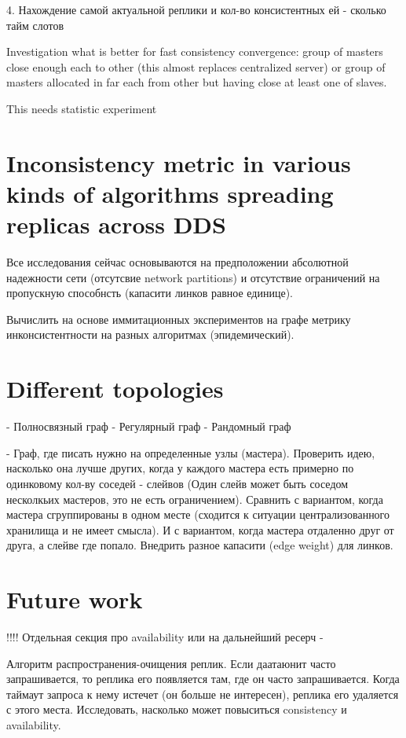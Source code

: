 \documentclass{llncs}
\begin{document}
4. Нахождение самой актуальной реплики и кол-во консистентных ей - сколько тайм слотов

Investigation what is better for fast consistency convergence:
group of masters close enough each to other (this almost replaces centralized server)
or group of masters allocated in far each from other but having close at least one of slaves.

This needs statistic experiment

\section{Inconsistency metric in various kinds of algorithms spreading replicas across DDS}
Все исследования сейчас основываются на предположении абсолютной надежности сети (отсутсвие network partitions) и отсутствие ограничений на пропускную способнсть (капасити линков равное единице).

Вычислить на основе иммитационных экспериментов на графе метрику инконсистентности на разных алгоритмах (эпидемический).

\section{Different topologies}
- Полносвязный граф
- Регулярный граф
- Рандомный граф

- Граф, где писать нужно на определенные узлы (мастера). Проверить идею, насколько она лучше других, когда у каждого мастера есть примерно по одинковому кол-ву соседей - слейвов (Один слейв может быть соседом несколкьих мастеров, это не есть ограничением). Сравнить с вариантом, когда мастера сгруппированы в одном месте (сходится к ситуации централизованного хранилища и не имеет смысла). И с вариантом, когда мастера отдаленно друг от друга, а слейве где попало.
Внедрить разное капасити (edge weight) для линков.

\section{Future work}
!!!! Отдельная секция про availability или на дальнейший ресерч -

Алгоритм распространения-очищения реплик. Если даатаюнит часто запрашивается, то реплика его появляется там, где он часто запрашивается. Когда таймаут запроса к нему истечет (он больше не интересен), реплика его удаляется с этого места.
Исследовать, насколько может повыситься consistency и availability.
\end{document}
